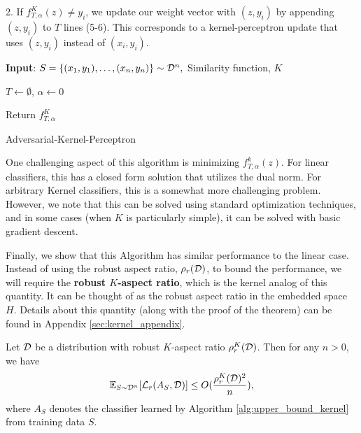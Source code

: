 2. If $f_{T, \alpha}^K(z) \neq y_i$, we update our weight vector with $(z, y_i)$ by appending $(z, y_i)$ to $T$ lines (5-6). This corresponds to a kernel-perceptron update that uses $(z, y_i)$ instead of $(x_i, y_i)$.

\begin{algorithm}[H]

\textbf{Input}:  $S = \{(x_1, y_1), \dots, (x_n, y_n)\} \sim {\mathcal D}^n,$ Similarity function, $K$

$T \leftarrow \emptyset$, $\alpha \leftarrow 0$

        
Return $f_{T, \alpha}^K$
   \caption{Adversarial-Kernel-Perceptron}
   \label{alg:upper_bound_kernel}
\end{algorithm}

One challenging aspect of this algorithm is minimizing $f_{T, \alpha}^k(z)$. For linear classifiers, this has a closed form solution that utilizes the dual norm. For arbitrary Kernel classifiers, this is a somewhat more challenging problem. However, we note that this can be solved using standard optimization techniques, and in some cases (when $K$ is particularly simple), it can be solved with basic gradient descent.

Finally, we show that this Algorithm has similar performance to the linear case. Instead of using the robust aspect ratio, $\rho_r({\mathcal D})$, to bound the performance, we will require the \textbf{robust $K$-aspect ratio}, which is the kernel analog of this quantity. It can be thought of as the robust aspect ratio in the embedded space $H$. Details about this quantity (along with the proof of the theorem) can be found in Appendix \ref{sec:kernel_appendix}.

\begin{thm}\label{thm:upper_bound_kernel}
Let ${\mathcal D}$ be a distribution with robust $K$-aspect ratio $\rho_r^K({\mathcal D})$. Then for any $n > 0$, we have $${\mathbb E}_{S \sim {\mathcal D}^n} [\mathcal L_r(A_S, {\mathcal D})] \leq O(\frac{\rho_r^K({\mathcal D})^2}{n}),$$ where $A_S$ denotes the classifier learned by Algorithm \ref{alg:upper_bound_kernel} from training data $S$. 
\end{thm}

